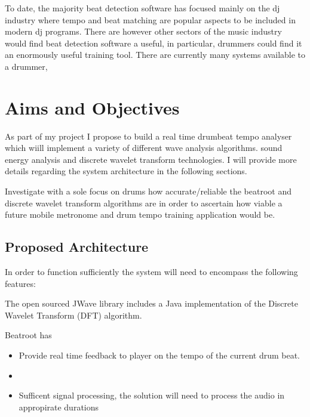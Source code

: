 \documentclass[a4paper, 11pt]{article}
\begin{document}
To date, the majority beat detection software has focused mainly on the dj industry where tempo and beat matching are popular aspects to be included in modern dj programs. There are however other sectors of the music industry would find beat detection software a useful, in particular, drummers could find it an enormously useful training tool. There are currently many systems available to a drummer, 




\subsection{}

\maketitle{} \section{Aims and Objectives}
As part of my project I propose to build a real time drumbeat tempo analyser which wiill implement a variety of different wave analysis algorithms. sound energy analysis and discrete wavelet transform technologies. I will provide more details regarding the system architecture in the following sections. 

Investigate with a sole focus on drums how accurate/reliable the beatroot and discrete wavelet transform algorithms are in order to ascertain how viable a future mobile metronome and drum tempo training application would be.



\subsection{Proposed Architecture}
In order to function sufficiently the system will need to encompass the following features:

The open sourced JWave library includes a Java implementation of the Discrete Wavelet Transform (DFT) algorithm.

Beatroot has 

\begin{itemize}
\item Provide real time feedback to player on the tempo of the current drum beat.
\item 
\item Sufficent signal processing, the solution will need to process the audio in appropirate durations 
\end{itemize}
\end{document}
